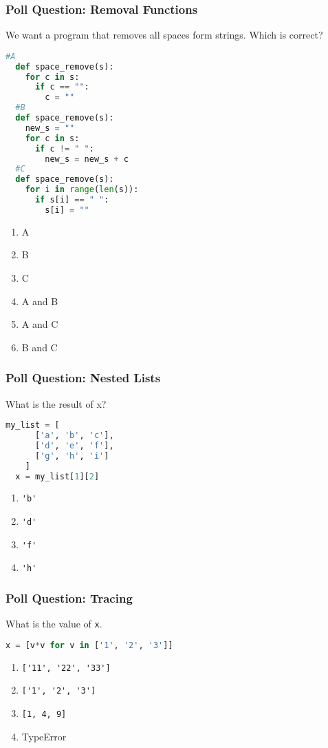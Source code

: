 \documentclass{beamer}
\begin{document}
%
%
\begin{frame}[fragile]
  \frametitle{Poll Question: Removal Functions}
  We want a program that removes all spaces form strings. Which is correct?\\
  \hfill
  \begin{minipage}{0.48\textwidth}
    \begin{lstlisting}[language=Python, autogobble]
  #A
  def space_remove(s):
    for c in s:
      if c == "":
        c = ""
  #B
  def space_remove(s):
    new_s = ""
    for c in s:
      if c != " ":
        new_s = new_s + c
  #C
  def space_remove(s):
    for i in range(len(s)):
      if s[i] == " ":
        s[i] = ""\end{lstlisting}
  \end{minipage}
  \hfill
  \begin{minipage}{0.48\textwidth}
    \hfill
    \begin{enumerate}[A]
      \item A
      \item B
      \item C
      \item A and B
      \item A and C
      \item B and C
    \end{enumerate}
  \end{minipage}
\end{frame}


%
%
\begin{frame}[fragile]
  \frametitle{Poll Question: Nested Lists}
  What is the result of x?
  \begin{lstlisting}[language=Python, autogobble]
  my_list = [
      ['a', 'b', 'c'],
      ['d', 'e', 'f'],
      ['g', 'h', 'i']
    ]
  x = my_list[1][2]
  \end{lstlisting}
  \vfill
  \begin{enumerate}[A]
    \item \lstinline|'b'|
    \item \lstinline|'d'|
    \item \lstinline|'f'|
    \item \lstinline|'h'|
  \end{enumerate}
\end{frame}

%
%
\begin{frame}[fragile]
  \frametitle{Poll Question: Tracing}
  What is the value of \lstinline|x|.
  \begin{lstlisting}[language=Python, autogobble]
  x = [v*v for v in ['1', '2', '3']]
  \end{lstlisting}
  \vfill
  \begin{enumerate}[A]
    \item \lstinline|['11', '22', '33']| 
    \item \lstinline|['1', '2', '3']|
    \item \lstinline|[1, 4, 9]|
    \item TypeError
  \end{enumerate}
\end{frame}
\end{document}

